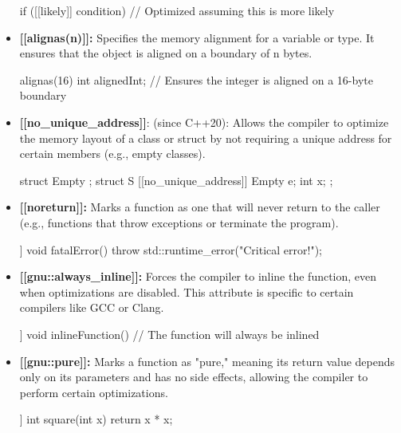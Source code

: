 \documentclass{report}
\begin{document}
\begin{itemize}
            \bigbreak \noindent 
            \begin{cppcode}
                if ([[likely]] condition) {
                    // Optimized assuming this is more likely
                }
            \end{cppcode}
        \item \textbf{[[alignas(n)]]:} Specifies the memory alignment for a variable or type. It ensures that the object is aligned on a boundary of n bytes.
            \bigbreak \noindent 
            \begin{cppcode}
                alignas(16) int alignedInt;  // Ensures the integer is aligned on a 16-byte boundary
            \end{cppcode}
        \item \textbf{[[no\_unique\_address]]}: (since C++20): Allows the compiler to optimize the memory layout of a class or struct by not requiring a unique address for certain members (e.g., empty classes).
            \bigbreak \noindent 
            \begin{cppcode}
                struct Empty {};
                struct S {
                    [[no_unique_address]] Empty e;
                    int x;
                };
            \end{cppcode}
        \item \textbf{[[noreturn]]:} Marks a function as one that will never return to the caller (e.g., functions that throw exceptions or terminate the program).
            \bigbreak \noindent 
            \begin{cppcode}
            [[noreturn]] void fatalError() {
                throw std::runtime_error("Critical error!");
            }
        \end{cppcode}
    \item \textbf{[[gnu::always\_inline]]:} Forces the compiler to inline the function, even when optimizations are disabled. This attribute is specific to certain compilers like GCC or Clang.
        \bigbreak \noindent 
        \begin{cppcode}
            [[gnu::always_inline]] void inlineFunction() {
                // The function will always be inlined
            }

            \end{cppcode}
        \item \textbf{[[gnu::pure]]:} Marks a function as "pure," meaning its return value depends only on its parameters and has no side effects, allowing the compiler to perform certain optimizations.
            \bigbreak \noindent 
            \begin{cppcode}
                [[gnu::pure]] int square(int x) {
                    return x * x;
                }

            \end{cppcode}
    \end{itemize}
\end{document}
